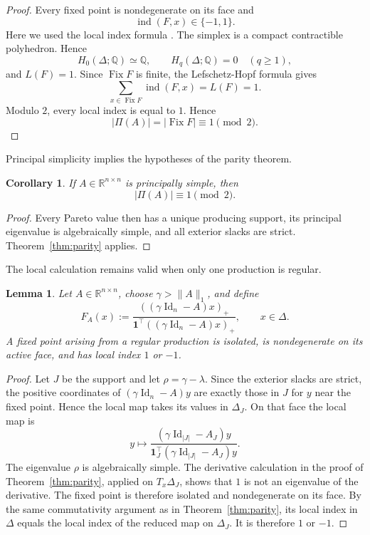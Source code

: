 \documentclass[11pt,a4paper]{article}
\newtheorem{lemma}[theorem]{Lemma}
\newtheorem{corollary}[theorem]{Corollary}
\theoremstyle{definition}
\newcommand{\R}{\mathbb R}
\newcommand{\Id}{\operatorname{Id}}
\newcommand{\one}{\mathbf 1}
\newcommand{\Fix}{\operatorname{Fix}}
\newcommand{\ind}{\operatorname{ind}}
\begin{document}
\begin{proof}
Every fixed point is nondegenerate on its face and
$$
\ind(F,x)\in\{-1,1\}.
$$
Here we used the local index formula
\cite[Section~12, pp.~326-329]{GranasDugundji2003}. The simplex is a
compact contractible polyhedron. Hence
$$
H_0(\Delta;\mathbb Q)\simeq\mathbb Q,
\qquad
H_q(\Delta;\mathbb Q)=0\quad(q\geq1),
$$
and $L(F)=1$. Since $\Fix F$ is finite, the Lefschetz-Hopf formula
\cite[Section~16, pp.~447-451]{GranasDugundji2003} gives
$$
\sum_{x\in\Fix F}\ind(F,x)=L(F)=1.
$$
Modulo $2$, every local index is equal to $1$. Hence
$$
|\Pi(A)|
=
|\Fix F|
\equiv1\pmod2.
$$
\end{proof}

Principal simplicity implies the hypotheses of the parity theorem.

\begin{corollary}
\label{cor:principally-simple-parity}
If $A\in\R^{n\times n}$ is principally simple, then
$$
|\Pi(A)|\equiv1\pmod2.
$$
\end{corollary}

\begin{proof}
Every Pareto value then has a unique producing support, its principal
eigenvalue is algebraically simple, and all exterior slacks are strict.
Theorem~\ref{thm:parity} applies.
\end{proof}

The local calculation remains valid when only one production is
regular.

\begin{lemma}
\label{lem:regular-local-index}
Let $A\in\R^{n\times n}$, choose $\gamma>\|A\|_1$, and define
$$
F_A(x):=
\frac{((\gamma\Id_n-A)x)_+}
{\one^\top((\gamma\Id_n-A)x)_+},
\qquad x\in\Delta.
$$
A fixed point arising from a regular production is isolated, is
nondegenerate on its active face, and has local index $1$ or $-1$.
\end{lemma}

\begin{proof}
Let $J$ be the support and let $\rho=\gamma-\lambda$. Since the
exterior slacks are strict, the positive coordinates of
$(\gamma\Id_n-A)y$ are exactly those in $J$ for $y$ near the fixed
point. Hence the local map takes its values in $\Delta_J$.
On that face the local map is
$$
y\longmapsto
\frac{(\gamma\Id_{|J|}-A_J)y}
{\one_J^\top(\gamma\Id_{|J|}-A_J)y}.
$$
The eigenvalue $\rho$ is algebraically simple. The derivative
calculation in the proof of Theorem~\ref{thm:parity}, applied on
$T_x\Delta_J$, shows that $1$ is not an eigenvalue of the derivative.
The fixed point is therefore isolated and nondegenerate on its face.
By the same commutativity argument as in
Theorem~\ref{thm:parity}, its local index in $\Delta$ equals the local
index of the reduced map on $\Delta_J$. It is therefore $1$ or $-1$.
\end{proof}
\end{document}
